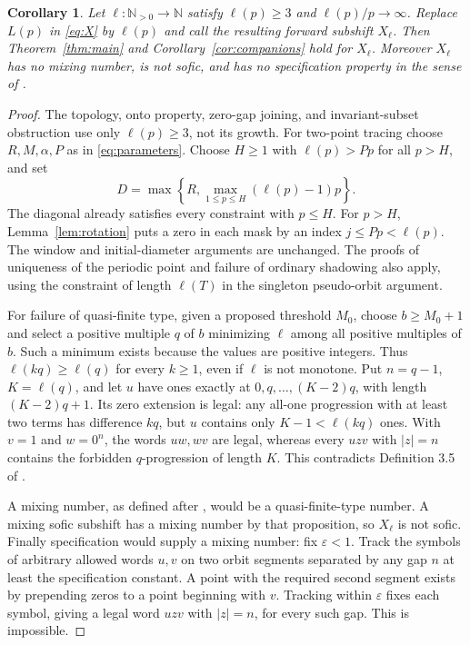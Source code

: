 \documentclass[11pt]{article}
\newtheorem{corollary}[theorem]{Corollary}
\begin{document}
\begin{corollary}\label{cor:general}
Let $\ell:\mathbb N_{>0}\to\mathbb N$ satisfy $\ell(p)\geq3$ and
$\ell(p)/p\to\infty$. Replace $L(p)$ in \eqref{eq:X} by $\ell(p)$
and call the resulting forward subshift $X_\ell$. Then
Theorem~\ref{thm:main} and Corollary~\ref{cor:companions} hold for
$X_\ell$. Moreover $X_\ell$ has no mixing number, is not sofic,
and has no specification property in the sense of \cite[Section 2]{MS}.
\end{corollary}
\begin{proof}
The topology, onto property, zero-gap joining, and invariant-subset
obstruction use only $\ell(p)\geq3$, not its growth. For two-point
tracing choose $R,M,\alpha,P$ as in \eqref{eq:parameters}.
Choose $H\geq1$ with $\ell(p)>Pp$ for all $p>H$, and set
\[
 D=\max\left\{R,\max_{1\leq p\leq H}(\ell(p)-1)p\right\}.
\]
The diagonal already satisfies every constraint with $p\leq H$.
For $p>H$, Lemma~\ref{lem:rotation} puts a zero in each mask
by an index $j\leq Pp<\ell(p)$. The window and initial-diameter
arguments are unchanged. The proofs of uniqueness of the periodic
point and failure of ordinary shadowing also apply, using the
constraint of length $\ell(T)$ in the singleton pseudo-orbit argument.

For failure of quasi-finite type, given a proposed threshold $M_0$,
choose $b\geq M_0+1$ and select a positive multiple $q$ of $b$
minimizing $\ell$ among all positive multiples of $b$. Such a minimum
exists because the values are positive integers. Thus
$\ell(kq)\geq\ell(q)$ for every $k\geq1$, even if $\ell$ is not
monotone. Put $n=q-1$, $K=\ell(q)$, and let $u$ have ones exactly
at $0,q,\ldots,(K-2)q$, with length $(K-2)q+1$.
Its zero extension is legal: any all-one progression with at least
two terms has difference $kq$, but $u$ contains only $K-1<\ell(kq)$
ones. With $v=1$ and $w=0^n$, the words $uw,wv$ are legal, whereas
every $uzv$ with $|z|=n$ contains the forbidden $q$-progression
of length $K$. This contradicts Definition 3.5 of \cite{MS}.

A mixing number, as defined after \cite[Proposition 2.3]{MS},
would be a quasi-finite-type number. A mixing sofic subshift has
a mixing number by that proposition, so $X_\ell$ is not sofic.
Finally specification would supply a mixing number: fix
$\varepsilon<1$. Track the symbols of arbitrary allowed words $u,v$
on two orbit segments separated by any gap $n$ at least the
specification constant. A point with the required second segment
exists by prepending zeros to a point beginning with $v$.
Tracking within $\varepsilon$ fixes each symbol, giving a legal
word $uzv$ with $|z|=n$, for every such gap. This is impossible.
\end{proof}
\end{document}
